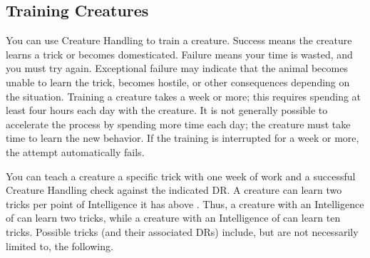     \subsection{Training Creatures}\label{Training Creatures}
        You can use Creature Handling to train a creature. Success means the creature learns a trick or becomes domesticated. Failure means your time is wasted, and you must try again. Exceptional failure may indicate that the animal becomes unable to learn the trick, becomes hostile, or other consequences depending on the situation. Training a creature takes a week or more; this requires spending at least four hours each day with the creature. It is not generally possible to accelerate the process by spending more time each day; the creature must take time to learn the new behavior. If the training is interrupted for a week or more, the attempt automatically fails.

         You can teach a creature a specific trick with one week of work and a successful Creature Handling check against the indicated DR\@. A creature can learn two tricks per point of Intelligence it has above . Thus, a creature with an Intelligence of  can learn two tricks, while a creature with an Intelligence of  can learn ten tricks. Possible tricks (and their associated DRs) include, but are not necessarily limited to, the following.

